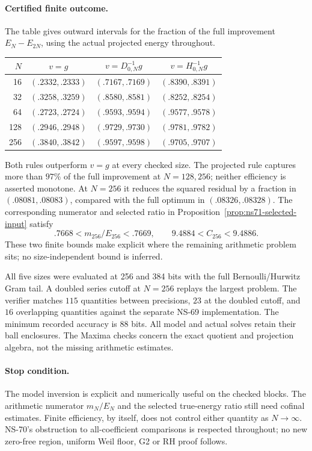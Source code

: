 \paragraph{Certified finite outcome.}
The table gives outward intervals for the fraction of the full
improvement $E_N-E_{2N}$, using the actual projected energy throughout.
\begin{center}\small
\begin{tabular}{rccc}
\toprule
$N$ & $v=g$ & $v=D_{0,N}^{-1}g$ & $v=H_{0,N}^{-1}g$\\
\midrule
16 & $(.2332,.2333)$ & $(.7167,.7169)$ & $(.8390,.8391)$\\
32 & $(.3258,.3259)$ & $(.8580,.8581)$ & $(.8252,.8254)$\\
64 & $(.2723,.2724)$ & $(.9593,.9594)$ & $(.9577,.9578)$\\
128 & $(.2946,.2948)$ & $(.9729,.9730)$ & $(.9781,.9782)$\\
256 & $(.3840,.3842)$ & $(.9597,.9598)$ & $(.9705,.9707)$\\
\bottomrule
\end{tabular}\end{center}
Both rules outperform $v=g$ at every checked size. The projected
rule captures more than $97\%$ of the full improvement at $N=128,256$;
neither efficiency is asserted monotone. At $N=256$ it reduces the
squared residual by a fraction in $(.08081,.08083)$, compared with
the full optimum in $(.08326,.08328)$. The corresponding numerator
and selected ratio in Proposition~\ref{prop:ns71-selected-input}
satisfy
\[
 .7668< m_{256}/E_{256}<.7669,\qquad
 9.4884<C_{256}<9.4886.
\]
These two finite bounds make explicit where the remaining arithmetic
problem sits; no size-independent bound is inferred.

All five sizes were evaluated at 256 and 384 bits with the full
Bernoulli/Hurwitz Gram tail. A doubled series cutoff at $N=256$
replays the largest problem. The verifier matches $115$ quantities
between precisions, $23$ at the doubled cutoff, and $16$ overlapping
quantities against the separate NS-69 implementation. The minimum
recorded accuracy is $88$ bits. All model and actual solves retain
their ball enclosures. The Maxima checks concern the exact quotient
and projection algebra, not the missing arithmetic estimates.

\paragraph{Stop condition.}
The model inversion is explicit and numerically useful on the checked
blocks. The arithmetic numerator $m_N/E_N$ and the selected true-energy
ratio still need cofinal estimates. Finite efficiency, by itself,
does not control either quantity as $N\to\infty$. NS-70's obstruction
to all-coefficient comparisons is respected throughout; no new
zero-free region, uniform Weil floor, G2 or RH proof follows.
